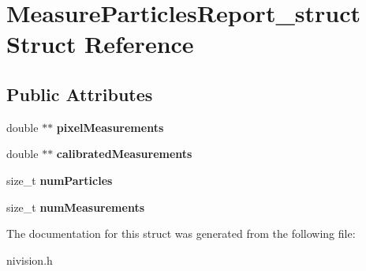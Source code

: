 \hypertarget{structMeasureParticlesReport__struct}{
\section{MeasureParticlesReport\_\-struct Struct Reference}
\label{structMeasureParticlesReport__struct}
}
\subsection*{Public Attributes}
\begin{DoxyCompactItemize}
\item 
\hypertarget{structMeasureParticlesReport__struct_a3e2270cc5214464b7073079576b015b3}{
double $\ast$$\ast$ {\bfseries pixelMeasurements}}
\label{structMeasureParticlesReport__struct_a3e2270cc5214464b7073079576b015b3}

\item 
\hypertarget{structMeasureParticlesReport__struct_ae6034244c14575dda67fe8f0a68fcc62}{
double $\ast$$\ast$ {\bfseries calibratedMeasurements}}
\label{structMeasureParticlesReport__struct_ae6034244c14575dda67fe8f0a68fcc62}

\item 
\hypertarget{structMeasureParticlesReport__struct_ab20bd36edfe2e90fe43fe5c5a2946647}{
size\_\-t {\bfseries numParticles}}
\label{structMeasureParticlesReport__struct_ab20bd36edfe2e90fe43fe5c5a2946647}

\item 
\hypertarget{structMeasureParticlesReport__struct_a3987cf7d569dc6068980f9f44a7f2fd1}{
size\_\-t {\bfseries numMeasurements}}
\label{structMeasureParticlesReport__struct_a3987cf7d569dc6068980f9f44a7f2fd1}

\end{DoxyCompactItemize}


The documentation for this struct was generated from the following file:\begin{DoxyCompactItemize}
\item 
nivision.h\end{DoxyCompactItemize}
